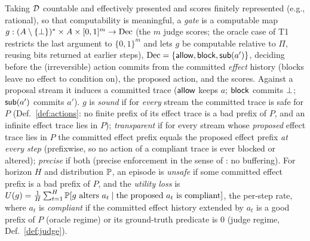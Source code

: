 \begin{definition}\label{def:gate}
Taking $\mathcal{D}$ countable and effectively presented and scores finitely represented
(e.g., rational), so that computability is meaningful, a \emph{gate} is a computable map $g:(A\setminus\{\bot\})^{*}\times A\times[0,1]^{m}\to\mathrm{Dec}$
(the $m$ judge scores; the oracle case of T1 restricts the last argument to $\{0,1\}^{m}$ and lets $g$ be computable relative to $\Pi$, reusing bits returned at earlier steps),
$\mathrm{Dec}=\{\mathsf{allow},\mathsf{block},\mathsf{sub}(a')\}$, deciding before the (irreversible) action commits from the
committed \emph{effect} history (blocks leave no effect to condition on), the proposed action,
and the scores. Against a proposal stream it induces a committed trace ($\mathsf{allow}$ keeps $a$; $\mathsf{block}$
commits $\bot$; $\mathsf{sub}(a')$ commits $a'$). $g$ is \emph{sound} if for \emph{every} stream the
committed trace is safe for $P$ (Def.~\ref{def:actions}: no finite prefix of its effect trace
is a bad prefix of $P$, and an infinite effect trace lies in $P$); \emph{transparent} if for every stream whose \emph{proposed} effect
trace lies in $P$ the committed effect prefix equals the proposed effect prefix \emph{at every
step} (prefixwise, so no action of a compliant trace is ever blocked or altered);
\emph{precise} if both (precise enforcement in the sense of
\citet{ligatti2005edit}: no buffering). For horizon $H$ and
distribution $\mathbb{P}$, an episode is \emph{unsafe} if some committed effect prefix is a
bad prefix of $P$, and the \emph{utility loss} is
$U(g)=\frac1H\sum_{t=1}^{H}\mathbb{P}[g\ \text{alters }a_t\mid\text{the proposed }a_t\ \text{is
compliant}]$, the per-step rate, where $a_t$ is \emph{compliant} if the committed effect history
extended by $a_t$ is a good prefix of $P$ (oracle regime) or its ground-truth predicate is $0$
(judge regime, Def.~\ref{def:judge}).
\end{definition}
